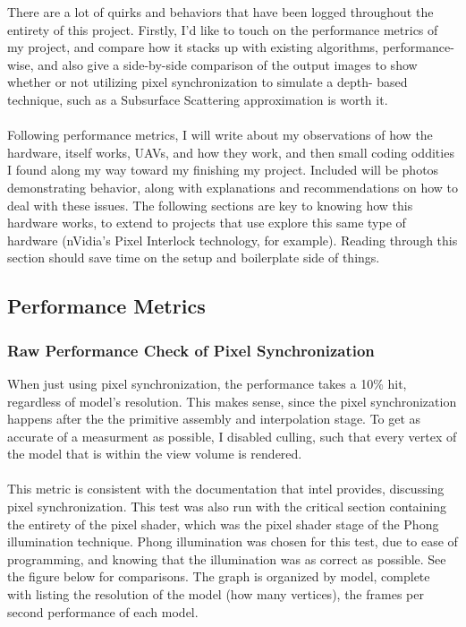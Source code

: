 \documentclass[a4paper, 12pt]{article}
\begin{document}
There are a lot of quirks and behaviors that have been logged throughout the
entirety of this project. Firstly, I'd like to touch on the performance
metrics of my project, and compare how it stacks up with existing algorithms,
performance-wise, and also give a side-by-side comparison of the output images
to show whether or not utilizing pixel synchronization to simulate a depth-
based technique, such as a Subsurface Scattering approximation is worth it. \\
\\ Following performance metrics, I will write about my observations of how
the hardware, itself works, UAVs, and how they work, and then small coding
oddities I found along my way toward my finishing my project. Included will be
photos demonstrating behavior, along with explanations and recommendations on
how to deal with these issues. The following sections are key to knowing how
this hardware works, to extend to projects that use explore this same type of
hardware (nVidia's Pixel Interlock technology, for example). Reading through
this section should save time on the setup and boilerplate side of things.

\subsection{Performance Metrics}
\label{section:findings}
\subsubsection{Raw Performance Check of Pixel Synchronization}

When just using pixel synchronization, the performance takes a 10\% hit,
regardless of model's resolution. This makes sense, since the pixel
synchronization happens after the the primitive assembly and interpolation
stage. To get as accurate of a measurment as possible, I disabled culling,
such that every vertex of the model that is within the view volume is
rendered. \\ \\ This metric is consistent with the documentation that intel
provides, discussing pixel synchronization. This test was also run with the
critical section containing the entirety of the pixel shader, which was the
pixel shader stage of the Phong illumination technique. Phong illumination was
chosen for this test, due to ease of programming, and knowing that the
illumination was as correct as possible. See the figure below for comparisons.
The graph is organized by model, complete with listing the resolution of the
model (how many vertices), the frames per second performance of each model.
\end{document}
